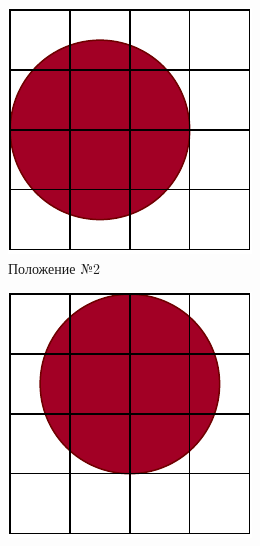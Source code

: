 \begin{figure}[h!]
\begin{subfigure}{0.17\textwidth}
        \includegraphics[width=\textwidth]{assets/c2.pdf}
        \caption{Положение №2}
    \end{subfigure}
    \begin{subfigure}{0.17\textwidth}
        \centering
        \includegraphics[width=\textwidth]{assets/c3.pdf}

\end{subfigure}
\end{figure}
